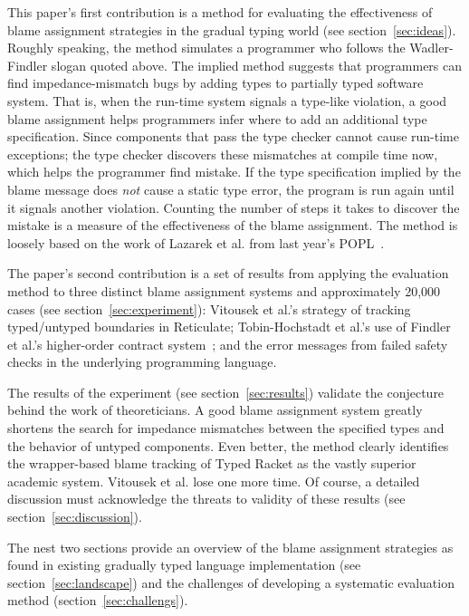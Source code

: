This paper's first contribution is a method for evaluating the effectiveness of
blame assignment strategies in the gradual typing world (see
section~\ref{sec:ideas}). Roughly speaking, the method simulates a programmer who
follows the Wadler-Findler slogan quoted above. The implied method suggests that
programmers can find impedance-mismatch bugs by adding types to partially typed
software system. That is, when the run-time system signals a type-like violation,
a good blame assignment helps programmers infer where to add an additional type
specification. Since components that pass the type checker cannot cause run-time
exceptions; the type checker discovers these mismatches at compile time now, which
helps the programmer find mistake.  If the type specification implied by the blame
message does {\em not\/} cause a static type error, the program is run again until
it signals another violation.  Counting the number of steps it takes to discover
the mistake is a measure of the effectiveness of the blame assignment.  The method
is loosely based on the work of Lazarek et al. from last year's
POPL~\cite{lksfd-popl-2020}. 

The paper's second contribution is a set of results from applying the evaluation
method to three distinct blame assignment systems and approximately 20,000
cases (see section~\ref{sec:experiment}): Vitousek et
al.'s strategy of tracking typed/untyped boundaries in Reticulate; Tobin-Hochstadt
et al.'s use of Findler et al.'s higher-order contract system~\cite{ff-icfp-2002,
mf-toplas-2009}; and the error messages from failed safety checks in the
underlying programming language.


The results of the experiment (see section~\ref{sec:results}) validate the
conjecture behind the work of theoreticians. A good blame assignment system
greatly shortens the search for impedance mismatches between the specified types
and the behavior of untyped components. Even better, the method clearly identifies
the wrapper-based blame tracking of Typed Racket as the vastly superior academic
system. Vitousek et al. lose one more time. Of course, a detailed discussion 
must acknowledge the threats to validity of these results (see
section~\ref{sec:discussion}).

The nest two sections provide an overview of the blame assignment strategies as
found in existing gradually typed language implementation (see
section~\ref{sec:landscape}) and the challenges of developing a systematic
evaluation method (section~\ref{sec:challengs}). 

